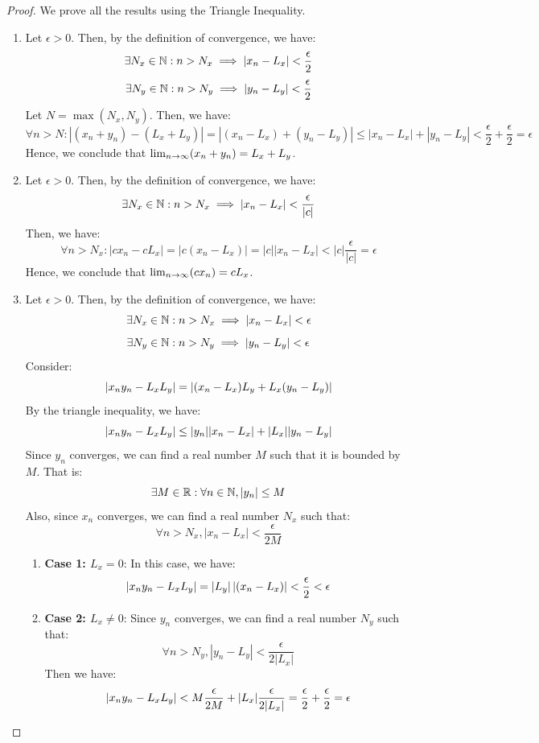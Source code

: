 \documentclass[openany]{book}
\begin{document}
\begin{proof}
    We prove all the results using the Triangle Inequality. 
    \begin{enumerate}
    \item Let $\epsilon > 0$. Then, by the definition of convergence, we have:
    $$\exists N_x \in \mathbb{N}: n > N_x \implies |x_n - L_x| < \frac{\epsilon}{2}$$
    $$\exists N_y \in \mathbb{N}: n > N_y \implies |y_n - L_y| < \frac{\epsilon}{2}$$
    Let $N = \max(N_x, N_y)$. Then, we have:
    $$\forall n > N: |(x_n + y_n) - (L_x + L_y)| = |(x_n - L_x) + (y_n - L_y)| \leq |x_n - L_x| + |y_n - L_y| < \frac{\epsilon}{2} + \frac{\epsilon}{2} = \epsilon$$
    Hence, we conclude that $\lim_{n \to \infty} (x_n + y_n) = L_x + L_y$. \\
    \item Let $\epsilon > 0$. Then, by the definition of convergence, we have:
    $$\exists N_x \in \mathbb{N}: n > N_x \implies |x_n - L_x| < \frac{\epsilon}{|c|}$$
    Then, we have:  
    $$\forall n > N_x: |cx_n - cL_x| = |c(x_n - L_x)| = |c||x_n - L_x| < |c|\frac{\epsilon}{|c|} = \epsilon$$
    Hence, we conclude that $\lim_{n \to \infty} (cx_n) = c L_x$. \\
    \item Let $\epsilon > 0$. Then, by the definition of convergence, we have:
    $$\exists N_x \in \mathbb{N}: n > N_x \implies |x_n - L_x| < \epsilon$$
    $$\exists N_y \in \mathbb{N}: n > N_y \implies |y_n - L_y| < \epsilon$$
    Consider: 
    $$\left| x_n y_n - L_x L_y \right| = \left| (x_n - L_x)L_y + L_x(y_n - L_y) \right|$$
    By the triangle inequality, we have:
    $$\left| x_n y_n - L_x L_y \right| \leq |y_n||x_n - L_x| + |L_x||y_n - L_y|$$
    Since $y_n$ converges, we can find a real number $M$ such that it is bounded by $M$. That is: 
    $$\exists M \in \mathbb{R}: \forall n \in \mathbb{N}, |y_n| \leq M$$
    Also, since $x_n$ converges, we can find a real number $N_x$ such that:
    $$\forall n > N_x, |x_n - L_x| < \frac{\epsilon}{2M}$$
    \begin{enumerate}
        \item \textbf{Case 1: $L_x = 0$}: In this case, we have:
        $$\left| x_n y_n - L_x L_y \right| = \left| L_y \right|\left| (x_n - L_x) \right| < \frac{\epsilon}{2} < \epsilon$$
        \item \textbf{Case 2: $L_x \neq 0$}: Since $y_n$ converges, we can find a real number $N_y$ such that:
        $$\forall n > N_y, |y_n - L_y| < \frac{\epsilon}{2|L_x|}$$
        Then we have:
        $$\left| x_n y_n - L_x L_y \right| < M\frac{\epsilon}{2M} + |L_x|\frac{\epsilon}{2|L_x|} = \frac{\epsilon}{2} + \frac{\epsilon}{2} = \epsilon$$
    \end{enumerate}
    \end{enumerate}
\end{proof}
\end{document}
